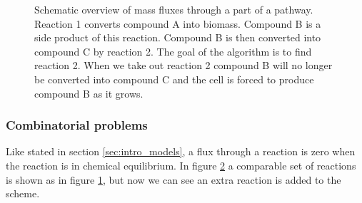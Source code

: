 \documentclass[12pt]{report}
\begin{document}
\begin{figure}[hbtp]
  \centering
     
      \caption{Schematic overview of mass fluxes through a part of a pathway. Reaction 1 converts compound A into biomass. Compound B is a side product of this reaction. Compound B is then converted into compound C by reaction 2. The goal of the algorithm is to find reaction 2. When we take out reaction 2 compound B will no longer be converted into compound C and the cell is forced to produce compound B as it grows.}
  \label{fig:reaction-overview1}
\end{figure}

\subsubsection{Combinatorial problems}
Like stated in section \ref{sec:intro_models}, a flux through a reaction is zero when the reaction is in chemical equilibrium. In figure \ref{fig:reaction-overview2} a comparable set of reactions is shown as in figure \ref{fig:reaction-overview1}, but now we can see an extra reaction is added to the scheme.
\begin{figure}[hbtp]
  \centering
     
      \caption{}
  \label{fig:reaction-overview2}
\end{figure}
\end{document}
